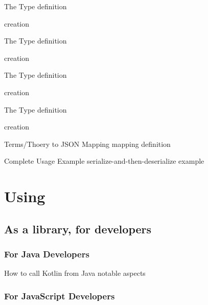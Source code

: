 \documentclass[handout]{beamer}
\begin{document}
\begin{frame}[allowframebreaks]{The  Type}
    definition

    creation
\end{frame}

\begin{frame}[allowframebreaks]{The  Type}
    definition

    creation
\end{frame}

\begin{frame}[allowframebreaks]{The  Type}
    definition

    creation
\end{frame}

\begin{frame}[allowframebreaks]{The  Type}
    definition

    creation
\end{frame}

\begin{frame}[allowframebreaks]{Terms/Thoery to JSON Mapping}
    mapping definition
\end{frame}

\begin{frame}[allowframebreaks]{Complete Usage Example}
    serialize-and-then-deserialize example
\end{frame}

\section{Using \twopkt}

\subsection{As a library, for developers}

\subsubsection{For Java Developers}

\begin{frame}[allowframebreaks]{How to call Kotlin from Java}
    notable aspects
\end{frame}

\subsubsection{For JavaScript Developers}
\end{document}
